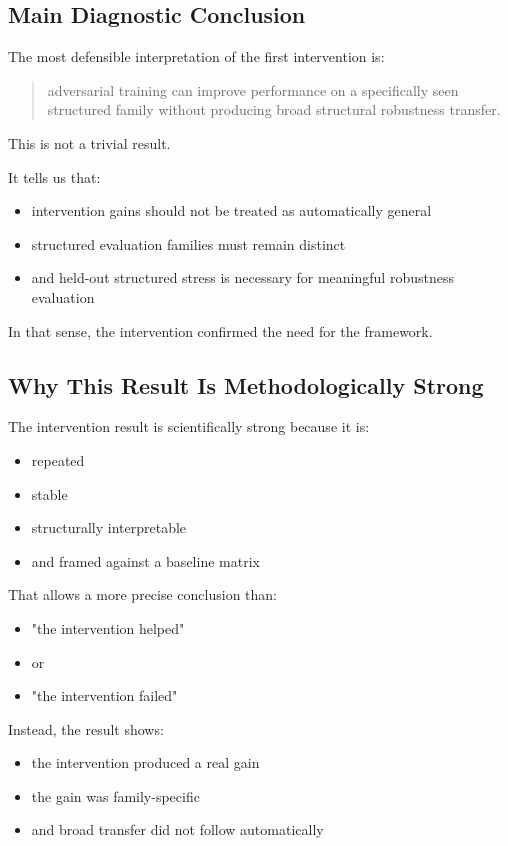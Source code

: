 \documentclass[11pt]{article}
\begin{document}
\subsection{Main Diagnostic Conclusion}

The most defensible interpretation of the first intervention is:

\begin{quote}
adversarial training can improve performance on a specifically seen structured family without producing broad structural robustness transfer.
\end{quote}

This is not a trivial result.

It tells us that:
\begin{itemize}[leftmargin=1.5em]
    \item intervention gains should not be treated as automatically general
    \item structured evaluation families must remain distinct
    \item and held-out structured stress is necessary for meaningful robustness evaluation
\end{itemize}

In that sense, the intervention confirmed the need for the framework.

\subsection{Why This Result Is Methodologically Strong}

The intervention result is scientifically strong because it is:
\begin{itemize}[leftmargin=1.5em]
    \item repeated
    \item stable
    \item structurally interpretable
    \item and framed against a baseline matrix
\end{itemize}

That allows a more precise conclusion than:
\begin{itemize}[leftmargin=1.5em]
    \item "the intervention helped"
    \item or
    \item "the intervention failed"
\end{itemize}

Instead, the result shows:
\begin{itemize}[leftmargin=1.5em]
    \item the intervention produced a real gain
    \item the gain was family-specific
    \item and broad transfer did not follow automatically
\end{itemize}
\end{document}
